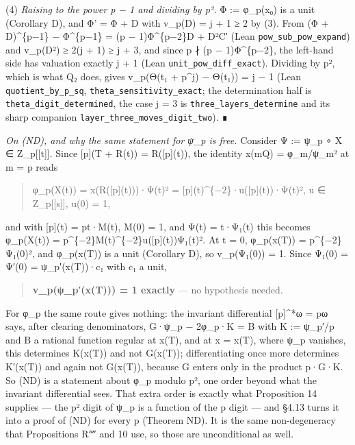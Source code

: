 \documentclass[11pt,a4paper]{article}
\theoremstyle{named}
\begin{document}
(4) \textit{Raising to the power p − 1 and dividing by p².} Φ := φ\_p(x₀) is a unit (Corollary D), and Φ' = Φ + D with v\_p(D) = j + 1 ≥ 2 by (3). From (Φ + D)\textasciicircum{}\{p−1\} − Φ\textasciicircum{}\{p−1\} = (p − 1)Φ\textasciicircum{}\{p−2\}D + D²C′ (Lean \texttt{pow\_\allowbreak{}sub\_\allowbreak{}pow\_\allowbreak{}expand}) and v\_p(D²) ≥ 2(j + 1) ≥ j + 3, and since p ∤ (p − 1)Φ\textasciicircum{}\{p−2\}, the left-hand side has valuation exactly j + 1 (Lean \texttt{unit\_\allowbreak{}pow\_\allowbreak{}diff\_\allowbreak{}exact}). Dividing by p², which is what Q₂ does, gives v\_p(Θ(t₁ + p\textasciicircum{}j) − Θ(t₁)) = j − 1 (Lean \texttt{quotient\_\allowbreak{}by\_\allowbreak{}p\_\allowbreak{}sq}, \texttt{theta\_\allowbreak{}sensitivity\_\allowbreak{}exact}; the determination half is \texttt{theta\_\allowbreak{}digit\_\allowbreak{}determined}, the case j = 3 is \texttt{three\_\allowbreak{}layers\_\allowbreak{}determine} and its sharp companion \texttt{layer\_\allowbreak{}three\_\allowbreak{}moves\_\allowbreak{}digit\_\allowbreak{}two}). ∎

\textit{On (ND), and why the same statement for ψ\_p is free.} Consider Ψ := ψ\_p ∘ X ∈ Z\_p[[t]]. Since [p](T + R(t)) = R([p](t)), the identity x(mQ) = φ\_m/ψ\_m² at m = p reads

\begin{quote}
φ\_p(X(t)) = x(R([p](t)))·Ψ(t)² = [p](t)\textasciicircum{}\{−2\}·u([p](t))·Ψ(t)²,  u ∈ Z\_p[[s]], u(0) = 1,
\end{quote}

and with [p](t) = pt·M(t), M(0) = 1, and Ψ(t) = t·Ψ₁(t) this becomes φ\_p(X(t)) = p\textasciicircum{}\{−2\}M(t)\textasciicircum{}\{−2\}u([p](t))Ψ₁(t)². At t = 0, φ\_p(x(T)) = p\textasciicircum{}\{−2\}Ψ₁(0)², and φ\_p(x(T)) is a unit (Corollary D), so v\_p(Ψ₁(0)) = 1. Since Ψ₁(0) = Ψ′(0) = ψ\_p′(x(T))·c₁ with c₁ a unit,

\begin{quote}
\textbf{v\_p(ψ\_p′(x(T))) = 1 exactly} — no hypothesis needed.
\end{quote}

For φ\_p the same route gives nothing: the invariant differential [p]\textasciicircum{}*ω = pω says, after clearing denominators, G·ψ\_p − 2φ\_p·K = B with K := ψ\_p′/p and B a rational function regular at x(T), and at x = x(T), where ψ\_p vanishes, this determines K(x(T)) and not G(x(T)); differentiating once more determines K′(x(T)) and again not G(x(T)), because G enters only in the product p·G·K. So (ND) is a statement about φ\_p modulo p², one order beyond what the invariant differential sees. That extra order is exactly what Proposition 14 supplies — the p² digit of ψ\_p is a function of the p digit — and §4.13 turns it into a proof of (ND) for every p (Theorem ND). It is the same non-degeneracy that Propositions R⁗ and 10 use, so those are unconditional as well.
\end{document}
